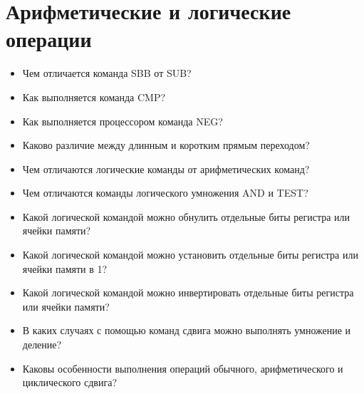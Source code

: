 \chapter{Арифметические и логические операции}
\begin{itemize}
\item Чем отличается команда SBB от SUB?
\item Как выполняется команда CMP?
\item Как выполняется процессором команда NEG?
\item Каково различие между длинным и коротким прямым переходом?
\item Чем отличаются логические команды от арифметических команд?
\item Чем отличаются команды логического умножения AND и TEST?
\item Какой логической командой можно обнулить отдельные биты регистра или ячейки памяти?
\item Какой логической командой можно установить отдельные биты регистра или ячейки памяти в 1?
\item Какой логической командой можно инвертировать отдельные биты регистра или ячейки памяти?
\item В каких случаях с помощью команд сдвига можно выполнять умножение и деление?
\item Каковы особенности выполнения операций обычного, арифметического и циклического сдвига?
\end{itemize}
\endinput